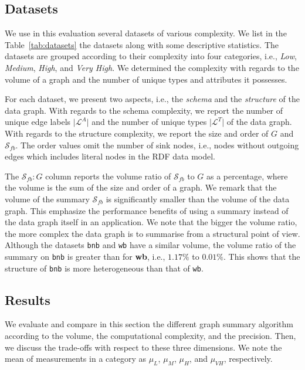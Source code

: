 \subsection{Datasets}
\label{sec:eval:datasets}

We use in this evaluation several datasets of various complexity. We list in the Table~\ref{tab:datasets} the datasets along with some descriptive statistics. The datasets are grouped according to their complexity into four categories, i.e., \emph{Low}, \emph{Medium}, \emph{High}, and \emph{Very High}. We determined the complexity with regards to the volume of a graph and the number of unique types and attributes it possesses.

For each dataset, we present two aspects, i.e., the \emph{schema} and the \emph{structure} of the data graph. With regards to the schema complexity, we report the number of unique edge labels $\vert \mathcal{L}^A \vert$ and the number of unique types $\vert \mathcal{L}^T \vert$ of the data graph. With regards to the structure complexity, we report the size and order of $G$ and  $\mathcal{S}_{fb}$. The order values omit the number of sink nodes, i.e., nodes without outgoing edges which includes literal nodes in the RDF data model.

The $\mathcal{S}_{fb}:G$ column reports the volume ratio of $\mathcal{S}_{fb}$ to $G$ as a percentage, where the volume is the sum of the size and order of a graph. We remark that the volume of the summary $\mathcal{S}_{fb}$ is significantly smaller than the volume of the data graph. This emphasize the performance benefits of using a summary instead of the data graph itself in an application. We note that the bigger the volume ratio, the more complex the data graph is to summarise from a structural point of view. Although the datasets \texttt{bnb} and \texttt{wb} have a similar volume, the volume ratio of the summary on \texttt{bnb} is greater than for \textbf{wb}, i.e., $1.17\%$ to $0.01\%$. This shows that the structure of \texttt{bnb} is more heterogeneous than that of \texttt{wb}.



\subsection{Results}
\label{sec:eval:results}

We evaluate and compare in this section the different graph summary algorithm according to the volume, the computational complexity, and the precision. Then, we discuss the trade-offs with respect to these three dimensions.
We note the mean of measurements in a category as $\mu_{L}$, $\mu_{M}$, $\mu_{H}$, and $\mu_{VH}$, respectively.

